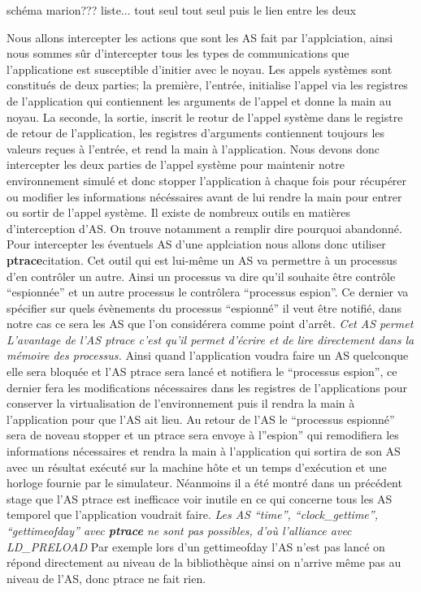 {\color{red} schéma marion???} liste... tout seul tout seul puis le lien entre
les deux

Nous allons intercepter les actions que sont les AS fait par l'applciation,
ainsi nous sommes sûr d'intercepter tous les types de communications que
l'applicatione est susceptible d'initier avec le noyau. Les appels systèmes sont
constitués de deux parties; la première, l'entrée, initialise l'appel via les
registres de l'application qui contiennent les arguments de l'appel et donne la
main au noyau. La seconde, la sortie, inscrit le reotur de l'appel système dans
le registre de retour de l'application, les registres d'arguments contiennent
toujours les valeurs reçues à l'entrée, et rend la main à l'application. Nous
devons donc intercepter les deux parties de l'appel système pour maintenir notre
environnement simulé et donc stopper l'application à chaque fois pour récupérer
ou modifier les informations nécéssaires avant de lui rendre la main pour entrer
ou sortir de l'appel système. Il existe de nombreux outils en matières
d'interception d'AS. On trouve notamment {\color{green} a remplir dire pourquoi
  abandonné}. Pour intercepter les éventuels AS d'une applciation nous allons
donc utiliser \textbf{ptrace}{\color{red}citation}. Cet outil qui est lui-même
un AS va permettre à un processus d'en contrôler un autre. Ainsi un processus va
dire qu'il souhaite être contrôle ``espionnée'' et un autre processus le
contrôlera ``processus espion''. Ce dernier va spécifier sur quels évènements du
processus ``espionné'' il veut être notifié, dans notre cas ce sera les AS que
l'on considérera comme point d'arrêt. \textit{Cet AS permet L'avantage de l'AS
  ptrace c'est qu'il permet d'écrire et de lire directement dans la mémoire des
  processus.} Ainsi quand l'application voudra faire un AS quelconque elle sera
bloquée et l'AS ptrace sera lancé et notifiera le ``processus espion'', ce
dernier fera les modifications nécessaires dans les registres de l'applications
pour conserver la virtualisation de l'environnement puis il rendra la main à
l'application pour que l'AS ait lieu. Au retour de l'AS le ``processus
espionné'' sera de noveau stopper et un ptrace sera envoye à l''espion'' qui
remodifiera les informations nécessaires et rendra la main à l'application qui
sortira de son AS avec un résultat exécuté sur la machine hôte et un temps
d'exécution et une horloge fournie par le simulateur. Néanmoins il a été montré
dans un précédent stage que l'AS ptrace est inefficace voir inutile en ce qui
concerne tous les AS temporel que l'application voudrait faire. \textit{Les AS
  ``time'', ``clock\_gettime'', ``gettimeofday'' avec \textbf{ptrace} ne sont
  pas possibles, d'où l'alliance avec LD\_PRELOAD} Par exemple lors d'un
gettimeofday l'AS n'est pas lancé on répond directement au niveau de la
bibliothèque ainsi on n'arrive même pas au niveau de l'AS, donc ptrace ne fait
rien.

